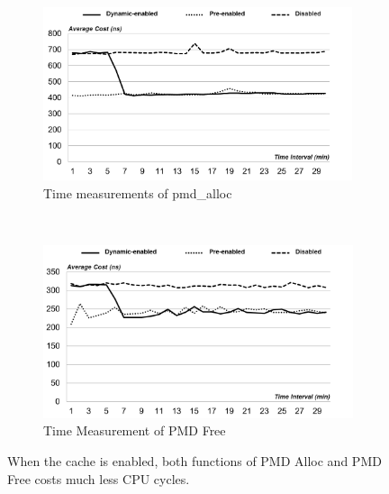 \begin{figure}[t!]
    \centering
    \begin{subfigure}[t]{0.5\textwidth}
        \centering
        \includegraphics[height=2.0in]{image/micro/PMDalloc.png}
        \caption{Time measurements of pmd\_alloc}
        \label{fig:subfig:a}
    \end{subfigure}%
    ~
    \begin{subfigure}[t]{0.5\textwidth}
        \centering
        \includegraphics[height=2.0in]{image/micro/PMDfree.png}
        \caption{Time Measurement of PMD Free}
        \label{fig:subfig:b}
    \end{subfigure}
    \caption{When the cache is enabled, both functions of PMD Alloc and PMD Free costs much less CPU cycles.}
    \label{fig:PMDtime}
\end{figure}

